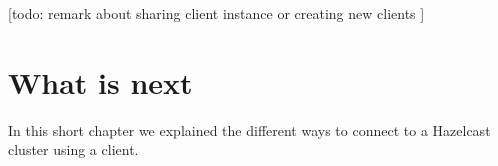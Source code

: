 [todo: remark about sharing client instance or creating new clients ]

\section{What is next}
In this short chapter we explained the different ways to connect to a Hazelcast cluster using a client.